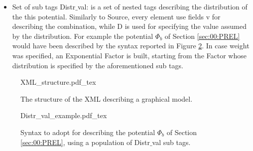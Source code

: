 \begin{itemize}
\begin{itemize}
\item Set of sub tags Distr$\_$val: is a set of nested tags describing the distribution of the this potential.
Similarly to Source, every element use fields v for describing the combination, while D is used for specifying the value assumed by the distribution.
For example the potential $\Phi _b$ of Section \ref{sec:00:PREL} would have been described by the syntax reported in Figure \ref{fig:00:XML_struct:Distr_val}.
In case weight was specified, an Exponential Factor is built, starting from the Factor whose distribution is specified by the aforementioned sub tags.
\end{itemize}
\end{itemize}

\begin{figure}
	\centering
\def\svgwidth{0.95 \columnwidth}
{XML_structure.pdf_tex} 
	\caption{The structure of the XML describing a graphical model.}
	\label{fig:00:XML_struct}
\end{figure} 

\begin{figure}
	\centering
\def\svgwidth{0.6 \columnwidth}
{Distr_val_example.pdf_tex} 
	\caption{Syntax to adopt for describing the potential $\Phi _b$ of Section \ref{sec:00:PREL}, using a population of Distr$\_$val sub tags.}
	\label{fig:00:XML_struct:Distr_val}
\end{figure} 

